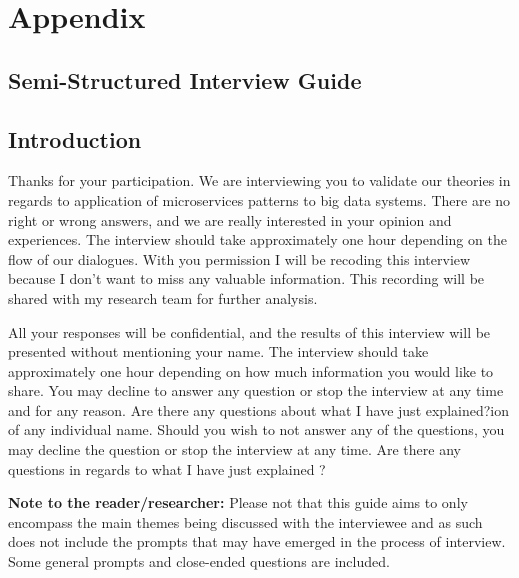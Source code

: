 \documentclass{bmcart}
\begin{document}
\section*{Appendix}


\begin{backmatter}

\section*{Semi-Structured Interview Guide} \label{interviewGuide}

\subsection*{Introduction}

Thanks for your participation. We are interviewing you to validate our theories in regards to application of microservices patterns to big data systems. There are no right or wrong answers, and we are really interested in your opinion and experiences. The interview should take approximately one hour depending on the flow of our dialogues. With you permission I will be recoding this interview because I don't want to miss any valuable information. This recording will be shared with my research team for further analysis. 

All your responses will be confidential, and the results of this interview will be presented without mentioning your name. The interview should take approximately one hour depending on how much information you would like to share. You may decline to answer any question or stop the interview at any time and for any reason. Are there any questions about what I have just explained?ion of any individual name. Should you wish to not answer any of the questions, you may decline the question or stop the interview at any time. Are there any questions in regards to what I have just explained ?

\hspace{2cm}

\textbf{Note to the reader/researcher:} Please not that this guide aims to only encompass the main themes being discussed with the interviewee and as such does not include the prompts that may have emerged in the process of interview. Some general prompts and close-ended questions are included.



\end{backmatter}
\end{document}
